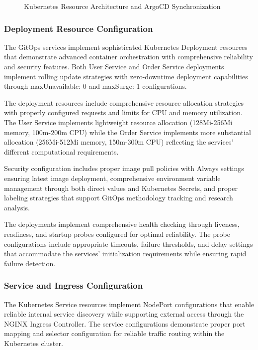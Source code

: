 \begin{figure}[H]
\centering
\caption{Kubernetes Resource Architecture and ArgoCD Synchronization}
\label{fig:kubernetes-argocd-architecture}
\end{figure}

\subsubsection{Deployment Resource Configuration}

The GitOps services implement sophisticated Kubernetes Deployment resources that demonstrate advanced container orchestration with comprehensive reliability and security features. Both User Service and Order Service deployments implement rolling update strategies with zero-downtime deployment capabilities through maxUnavailable: 0 and maxSurge: 1 configurations.

The deployment resources include comprehensive resource allocation strategies with properly configured requests and limits for CPU and memory utilization. The User Service implements lightweight resource allocation (128Mi-256Mi memory, 100m-200m CPU) while the Order Service implements more substantial allocation (256Mi-512Mi memory, 150m-300m CPU) reflecting the services' different computational requirements.

Security configuration includes proper image pull policies with Always settings ensuring latest image deployment, comprehensive environment variable management through both direct values and Kubernetes Secrets, and proper labeling strategies that support GitOps methodology tracking and research analysis.

The deployments implement comprehensive health checking through liveness, readiness, and startup probes configured for optimal reliability. The probe configurations include appropriate timeouts, failure thresholds, and delay settings that accommodate the services' initialization requirements while ensuring rapid failure detection.

\subsubsection{Service and Ingress Configuration}

The Kubernetes Service resources implement NodePort configurations that enable reliable internal service discovery while supporting external access through the NGINX Ingress Controller. The service configurations demonstrate proper port mapping and selector configuration for reliable traffic routing within the Kubernetes cluster.

